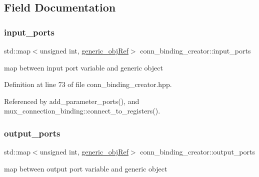 \subsection{Field Documentation}
\mbox{\label{classconn__binding__creator_ae0e0355179dfa05ad0ee3cfd84d10366}} 
\subsubsection{\texorpdfstring{input\+\_\+ports}{input\_ports}}
{\footnotesize\ttfamily std\+::map$<$unsigned int, \hyperlink{generic__obj_8hpp_acb533b2ef8e0fe72e09a04d20904ca81}{generic\+\_\+obj\+Ref}$>$ conn\+\_\+binding\+\_\+creator\+::input\+\_\+ports\hspace{0.3cm}{\ttfamily [protected]}}



map between input port variable and generic object 



Definition at line 73 of file conn\+\_\+binding\+\_\+creator.\+hpp.



Referenced by add\+\_\+parameter\+\_\+ports(), and mux\+\_\+connection\+\_\+binding\+::connect\+\_\+to\+\_\+registers().

\mbox{\label{classconn__binding__creator_af520959bd65e1b4024be9fc0837c9d52}} 
\subsubsection{\texorpdfstring{output\+\_\+ports}{output\_ports}}
{\footnotesize\ttfamily std\+::map$<$unsigned int, \hyperlink{generic__obj_8hpp_acb533b2ef8e0fe72e09a04d20904ca81}{generic\+\_\+obj\+Ref}$>$ conn\+\_\+binding\+\_\+creator\+::output\+\_\+ports\hspace{0.3cm}{\ttfamily [protected]}}



map between output port variable and generic object 




